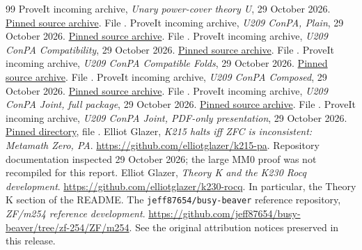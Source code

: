 \begin{thebibliography}{99}
 ProveIt incoming archive, \emph{Unary power-cover theory U}, 29 October 2026.
\href{https://github.com/VladimirReshetnikov/ProveIt/blob/343da82d7384d10ec9fd1c17361fc923b2d1d117/docs/incoming/pa_unary_power_cover.zip}{Pinned source archive}. File .
 ProveIt incoming archive, \emph{U209 ConPA, Plain}, 29 October 2026.
\href{https://github.com/VladimirReshetnikov/ProveIt/blob/343da82d7384d10ec9fd1c17361fc923b2d1d117/docs/incoming/U209_ConPA_2026-10-29.zip}{Pinned source archive}. File .
 ProveIt incoming archive, \emph{U209 ConPA Compatibility}, 29 October 2026.
\href{https://github.com/VladimirReshetnikov/ProveIt/blob/343da82d7384d10ec9fd1c17361fc923b2d1d117/docs/incoming/U209_ConPA_Compatibility_2026-10-29.zip}{Pinned source archive}. File .
 ProveIt incoming archive, \emph{U209 ConPA Compatible Folds}, 29 October 2026.
\href{https://github.com/VladimirReshetnikov/ProveIt/blob/343da82d7384d10ec9fd1c17361fc923b2d1d117/docs/incoming/U209_ConPA_Compatible_Folds_2026-10-29.zip}{Pinned source archive}. File .
 ProveIt incoming archive, \emph{U209 ConPA Composed}, 29 October 2026.
\href{https://github.com/VladimirReshetnikov/ProveIt/blob/343da82d7384d10ec9fd1c17361fc923b2d1d117/docs/incoming/U209_ConPA_Composed_2026-10-29.zip}{Pinned source archive}. File .
 ProveIt incoming archive, \emph{U209 ConPA Joint, full package}, 29 October 2026.
\href{https://github.com/VladimirReshetnikov/ProveIt/blob/343da82d7384d10ec9fd1c17361fc923b2d1d117/docs/incoming/U209_ConPA_Joint_2026-10-29.zip}{Pinned source archive}. File .
 ProveIt incoming archive, \emph{U209 ConPA Joint, PDF-only presentation}, 29 October 2026.
\href{https://github.com/VladimirReshetnikov/ProveIt/tree/343da82d7384d10ec9fd1c17361fc923b2d1d117/docs/incoming}{Pinned directory}, file .
 Elliot Glazer, \emph{K215 halts iff ZFC is inconsistent: Metamath Zero, PA}.
\url{https://github.com/elliotglazer/k215-pa}. Repository documentation inspected 29 October 2026; the large MM0 proof was not recompiled for this report.
 Elliot Glazer, \emph{Theory K and the K230 Rocq development}.
\url{https://github.com/elliotglazer/k230-rocq}. In particular, the Theory K section of the README.
 The \texttt{jeff87654/busy-beaver} reference repository, \emph{ZF/m254 reference development}.
\url{https://github.com/jeff87654/busy-beaver/tree/zf-254/ZF/m254}. See the original attribution notices preserved in this release.
\end{thebibliography}
